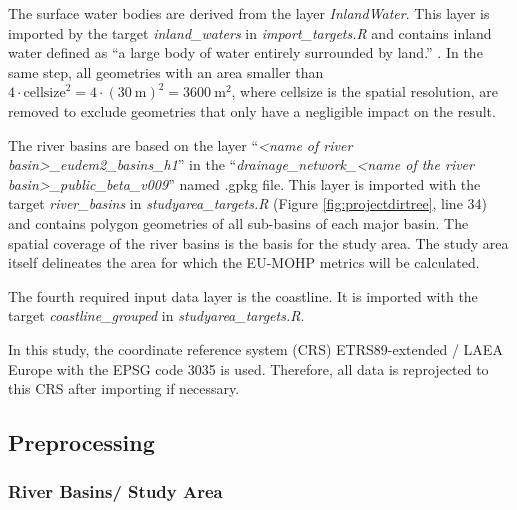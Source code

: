 \documentclass[fleqn,10pt]{wlscirep}
\begin{document}
The surface water bodies are derived from the layer \emph{InlandWater}. This layer is imported by the target \emph{inland\_waters} in \emph{import\_targets.R} and contains inland water defined as ``a large body of water entirely surrounded by land.'' \cite{gallaun_eu-hydro_2019}. In the same step, all geometries with an area smaller than \(4 \cdot \text{cellsize}^2 = 4 \cdot (30\: \text{m})^2 = 3600\: \text{m}^2\), where cellsize is the spatial resolution, are removed to exclude geometries that only have a negligible impact on the result.

The river basins are based on the layer ``\emph{\textless name of river basin\textgreater\_eudem2\_basins\_h1}'' in the ``\emph{drainage\_network\_\textless name of the river basin\textgreater\_public\_beta\_v009}'' named .gpkg file. This layer is imported with the target \emph{river\_basins} in \emph{studyarea\_targets.R} (Figure \ref{fig:projectdirtree}, line 34) and contains polygon geometries of all sub-basins of each major basin. The spatial coverage of the river basins is the basis for the study area. The study area itself delineates the area for which the EU-MOHP\cite{nolscher_eu-mohp_2021-1} metrics will be calculated.

The fourth required input data layer is the coastline. It is imported with the target \emph{coastline\_grouped} in \emph{studyarea\_targets.R}.

In this study, the coordinate reference system (CRS) ETRS89-extended / LAEA Europe with the EPSG code 3035 is used. Therefore, all data is reprojected to this CRS after importing if necessary.

\hypertarget{preprocessing}{%
\subsection*{Preprocessing}\label{preprocessing}}

\hypertarget{river-basins-study-area}{%
\subsubsection*{River Basins/ Study Area}\label{river-basins-study-area}}
\end{document}

